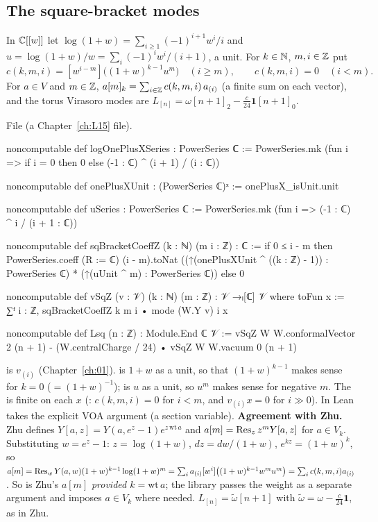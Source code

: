 \subsection{The square-bracket modes}

\begin{definition}\label{l14:def:sqbracket}
In ${\mathbb{C}}[[w]]$ let $\log(1+w) = \sum_{i\ge1}(-1)^{i+1}w^i/i$ and $u = \log(1+w)/w = \sum_i(-1)^iw^i/(i+1)$, a unit. For
$k\in{\mathbb{N}}$, $m,i\in{\mathbb{Z}}$ put
\begin{equation*}
  c(k,m,i) = [w^{i-m}]\bigl((1+w)^{k-1}u^m\bigr)\quad(i\ge m),\qquad c(k,m,i) = 0\quad(i<m).
\end{equation*}
For $a\in V$ and $m\in{\mathbb{Z}}$, $a[m]_k = \sum_{i\in{\mathbb{Z}}}c(k,m,i)\,a_{(i)}$ (a finite sum on each vector), and the torus Virasoro modes are
$L_{[n]} = \omega[n+1]_2 - \frac{c}{24}\mathbf 1[n+1]_0$.
\end{definition}
\noindent File  (a Chapter~\ref{ch:L15} file).
\begin{leancode}
noncomputable def logOnePlusXSeries : PowerSeries ℂ :=
  PowerSeries.mk (fun i => if i = 0 then 0 else (-1 : ℂ) ^ (i + 1) / (i : ℂ))

noncomputable def onePlusXUnit : (PowerSeries ℂ)ˣ := onePlusX_isUnit.unit

noncomputable def uSeries : PowerSeries ℂ := PowerSeries.mk (fun i => (-1 : ℂ) ^ i / (i + 1 : ℂ))

noncomputable def sqBracketCoeffZ (k : ℕ) (m i : ℤ) : ℂ :=
  if 0 ≤ i - m then
    PowerSeries.coeff (R := ℂ) (i - m).toNat
      ((↑(onePlusXUnit ^ ((k : ℤ) - 1)) : PowerSeries ℂ) * (↑(uUnit ^ m) : PowerSeries ℂ))
  else 0

noncomputable def vSqZ (v : 𝒱) (k : ℕ) (m : ℤ) : 𝒱 →ₗ[ℂ] 𝒱 where
  toFun x := ∑ᶠ i : ℤ, sqBracketCoeffZ k m i • mode (W.Y v) i x

noncomputable def Lsq (n : ℤ) : Module.End ℂ 𝒱 :=
  vSqZ W W.conformalVector 2 (n + 1)
    - (W.centralCharge / 24) • vSqZ W W.vacuum 0 (n + 1)
\end{leancode}
\begin{dictionary}
 is $v_{(i)}$ (Chapter~\ref{ch:01}).  is $1+w$ as a unit, so that $(1+w)^{k-1}$
makes sense for $k=0$ ($=(1+w)^{-1}$);  is $u$ as a unit, so $u^m$ makes sense for negative $m$. The 
is finite on each $x$ (: $c(k,m,i) = 0$ for $i<m$, and $v_{(i)}x = 0$ for $i\gg0$). In Lean
 takes the explicit VOA argument  (a section variable). \textbf{Agreement with Zhu.} Zhu defines
$Y[a,z] = Y(a,e^z-1)e^{z\,\mathrm{wt}\,a}$ and $a[m] = \operatorname{Res}_zz^mY[a,z]$ for $a\in V_k$. Substituting $w = e^z-1$:
$z = \log(1+w)$, $dz = dw/(1+w)$, $e^{kz} = (1+w)^k$, so $a[m] = \operatorname{Res}_wY(a,w)(1+w)^{k-1}\log(1+w)^m = \sum_ia_{(i)}[w^i]
\bigl((1+w)^{k-1}w^mu^m\bigr) = \sum_ic(k,m,i)a_{(i)}$. So  is Zhu's $a[m]$ \emph{provided $k = \mathrm{wt}\,a$};
the library passes the weight as a separate argument and imposes $a\in V_k$ where needed. $L_{[n]} = \tilde\omega[n+1]$ with
$\tilde\omega = \omega - \frac c{24}\mathbf 1$, as in Zhu.
\end{dictionary}
